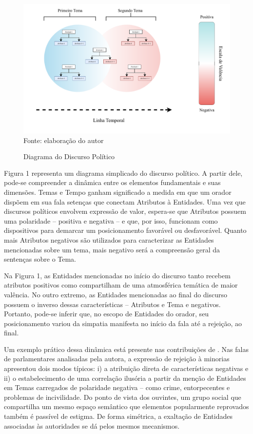 \documentclass[
12pt,				%
openright,			%
twoside,			%
a4paper,			%
english,			%
french,				%
spanish,			%
brazil				%
]{abntex2}
\begin{document}
\begin{figure}[h]
	\caption{Diagrama do Discurso Político}
	\label{fig:diagrama}
	\centering
	\includegraphics[width=1\linewidth]{figures/diagrama_discurso_autoritario}
	Fonte: elaboração do autor
\end{figure}

Figura 1 representa um diagrama simplicado do discurso político. A partir dele, pode-se compreender a dinâmica entre os elementos fundamentais e suas dimensões. Temas e Tempo ganham significado a medida em que um orador dispõem em sua fala setenças que conectam Atributos à Entidades. Uma vez que discursos políticos envolvem expressão de valor, espera-se que Atributos possuem uma polaridade -- positiva e negativa -- e que, por isso, funcionam como dispositivos para demarcar um posicionamento favorável ou desfavorável. Quanto mais Atributos negativos são utilizados para caracterizar as Entidades mencionadas sobre um tema, mais negativo será a compreensão geral da sentenças sobre o Tema.

Na Figura 1, as Entidades mencionadas no início do discurso tanto recebem atributos positivos como compartilham de uma atmosférica temática de maior valência. No outro extremo, as Entidades mencionadas ao final do discurso possuem o inverso dessas características -- Atributos e Tema e negativos. Portanto, pode-se inferir que, no escopo de Entidades do orador, seu posicionamento variou da simpatia manifesta no início da fala até a rejeição, ao final.

Um exemplo prático dessa dinâmica está presente nas contribuições de . Nas falas de parlamentares analisadas pela autora, a expressão de rejeição à minorias apresentou dois modos típicos: i) a atribuição direta de características negativas e ii) o estabelecimento de uma correlação ilusória a partir da menção de Entidades em Temas carregados de polaridade negativa -- como crime, entorpecentes e problemas de incivilidade. Do ponto de vista dos ouvintes, um grupo social que compartilha um mesmo espaço semântico que elementos popularmente reprovados também é passível de estigma. De forma simétrica, a exaltação de Entidades associadas às autoridades se dá pelos mesmos mecanismos.
\end{document}
